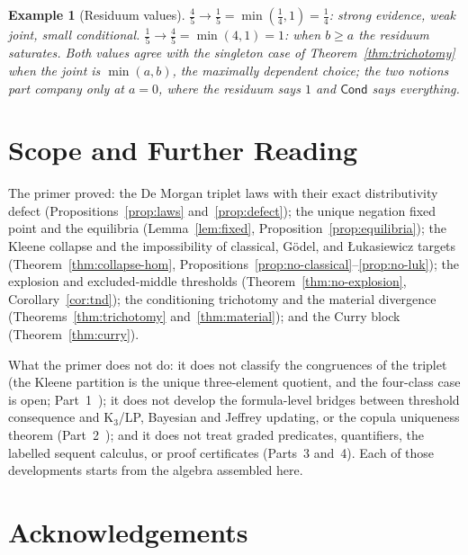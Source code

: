 \documentclass[11pt,a4paper]{article}
\newtheorem{example}[theorem]{Example}
\newcommand{\Cond}{\mathsf{Cond}}
\begin{document}
\begin{example}[Residuum values]
\label{ex:resid}
$\tfrac{4}{5} \to \tfrac{1}{5} = \min(\tfrac{1}{4}, 1) =
\tfrac{1}{4}$:
strong evidence, weak joint, small conditional.
$\tfrac{1}{5} \to \tfrac{4}{5} = \min(4, 1) = 1$:
when $b \geq a$ the residuum saturates.
Both values agree with the singleton case of
Theorem~\ref{thm:trichotomy} when the joint is $\min(a,b)$, the
maximally dependent choice; the two notions part company only at
$a = 0$, where the residuum says $1$ and $\Cond$ says everything.
\end{example}

\section{Scope and Further Reading}
\label{sec:scope}

The primer proved:
the De Morgan triplet laws with their exact distributivity defect
(Propositions~\ref{prop:laws} and~\ref{prop:defect});
the unique negation fixed point and the equilibria
(Lemma~\ref{lem:fixed}, Proposition~\ref{prop:equilibria});
the Kleene collapse and the impossibility of classical, G\"odel, and
\L ukasiewicz targets
(Theorem~\ref{thm:collapse-hom},
Propositions~\ref{prop:no-classical}--\ref{prop:no-luk});
the explosion and excluded-middle thresholds
(Theorem~\ref{thm:no-explosion}, Corollary~\ref{cor:tnd});
the conditioning trichotomy and the material divergence
(Theorems~\ref{thm:trichotomy} and~\ref{thm:material});
and the Curry block (Theorem~\ref{thm:curry}).

What the primer does not do:
it does not classify the congruences of the triplet (the Kleene
partition is the unique three-element quotient, and the four-class
case is open; Part~1~\cite{part1});
it does not develop the formula-level bridges between threshold
consequence and K$_3$/LP, Bayesian and Jeffrey updating, or the
copula uniqueness theorem (Part~2~\cite{part2});
and it does not treat graded predicates, quantifiers, the labelled
sequent calculus, or proof certificates (Parts~3 and~4).
Each of those developments starts from the algebra assembled here.

\section*{Acknowledgements}
\end{document}
